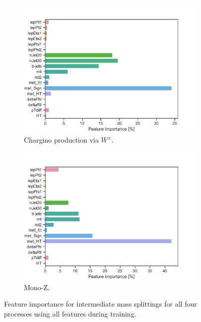 \begin{figure}[H]
    \begin{subfigure}[t!]{0.49\textwidth}
        \includegraphics[width = \textwidth]{Figures/WW/BDT/All_level/Inter/featureImportance.pdf}
        \caption{Chargino production via $W^\pm$.}
        \label{fig:featWWInter}
    \end{subfigure}
    \begin{subfigure}[t!]{0.49\textwidth}
        \includegraphics[width = \textwidth]{Figures/Mono_Z/ML/BDT/All_level/Inter/featureImportance.pdf}
        \caption{Mono-Z.}
        \label{fig:featMonoZInter}
    \end{subfigure}
    \caption{Feature importance for intermediate mass splittings for all four processes using all features during training.}
    \label{fig:featAllInterBDT}
\end{figure}

